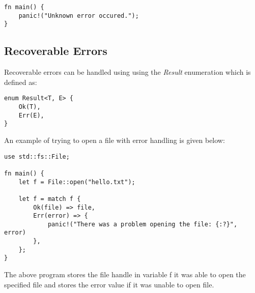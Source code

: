 \documentclass[12pt, titlepage]{article}
\begin{document}
\begin{lstlisting}
fn main() {
    panic!("Unknown error occured.");
}
\end{lstlisting}

\subsection{Recoverable Errors}
Recoverable errors can be handled using using the \textit{Result} enumeration which is defined as:

\begin{lstlisting}
enum Result<T, E> {
    Ok(T),
    Err(E),
}
\end{lstlisting}

An example of trying to open a file with error handling is given below\cite{RustResult}:
\begin{lstlisting}
use std::fs::File;

fn main() {
    let f = File::open("hello.txt");

    let f = match f {
        Ok(file) => file,
        Err(error) => {
            panic!("There was a problem opening the file: {:?}", error)
        },
    };
}
\end{lstlisting}
The above program stores the file handle in variable f it was able to open the
specified file and stores the error value if it was unable to open file.



\end{document}
